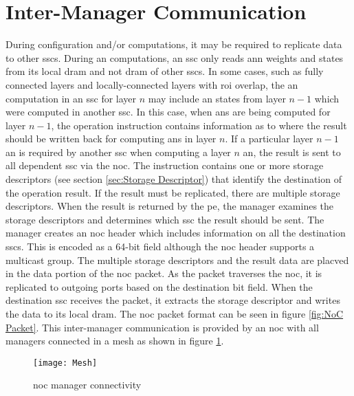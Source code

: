 \section{Inter-Manager Communication}
\label{sec:Inter-Manager Communication}

During configuration and/or computations, it may be required to replicate data to other \acp{ssc}.
During \ac{an} computations, an \ac{ssc} only reads \ac{ann} weights and states from its local \ac{dram} and not \ac{dram} of other \acp{ssc}.
In some cases, such as fully connected layers and locally-connected layers with \ac{roi} overlap, the \ac{an} computation in an \ac{ssc} for layer $n$ may include \ac{an} states from layer $n-1$ which were computed in another \ac{ssc}.
In this case, when \acp{an} are being computed for layer $n-1$, the operation instruction contains information as to where the result should be written back for computing \acp{an} in layer $n$.
If a particular layer $n-1$ \ac{an} is required by another \ac{ssc} when computing a layer $n$ \ac{an}, the result is sent to all dependent \ac{ssc} via the \ac{noc}.
The instruction contains one or more storage descriptors (see section \ref{sec:Storage Descriptor}) that identify the destination of the operation result.
If the result must be replicated, there are multiple storage descriptors. When the result is returned by the \ac{pe}, the manager examines the storage descriptors and determines which \ac{ssc} the result should be sent.
The manager creates an \ac{noc} header which includes information on all the destination \acp{ssc}. 
This is encoded as a 64-bit field although the \ac{noc} header supports a multicast group. 
The multiple storage descriptors and the result data are placved in the data portion of the \ac{noc} packet.
As the packet traverses the \ac{noc}, it is replicated to outgoing ports based on the destination bit field.
When the destination \ac{ssc} receives the packet, it extracts the storage descriptor and writes the data to its local \ac{dram}.
The \ac{noc} packet format can be seen in figure \ref{fig:NoC Packet}.
This inter-manager communication is provided by an \ac{noc} with all managers connected in a mesh as shown in figure \ref{fig:Mesh}.
\begin{figure}[!t]
\centering
\captionsetup{justification=centering}
\centerline{
\mbox{\texttt{[image: Mesh]}}
}
\caption{\ac{noc} manager connectivity}
\label{fig:Mesh}
\end{figure}

